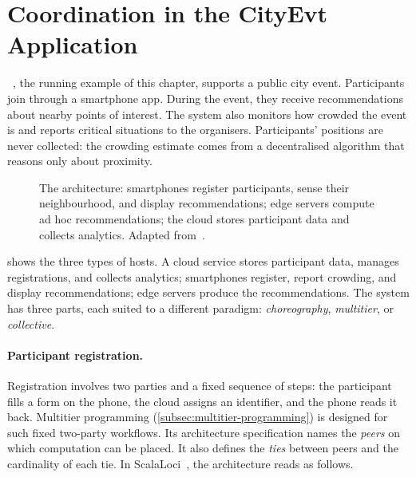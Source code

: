 \section{Coordination in the CityEvt Application}
\label{sec:multiparty-motivation}

\cityevt~\cite{Farabegoli:2026:CaMiL}, the running example of this chapter, supports a public city event.
%
Participants join through a smartphone app.
During the event, they receive recommendations about nearby points of interest.
%
The system also monitors how crowded the event is and reports critical situations to the organisers.
%
Participants' positions are never collected:
the crowding estimate comes from a decentralised algorithm that reasons only about proximity.

\begin{figure}[t]
    \centering
    \def\svgwidth{0.50\textwidth}
    
    \caption[The CityEvt architecture]{The \cityevt architecture: smartphones register participants, sense their neighbourhood, and display recommendations; edge servers compute ad hoc recommendations; the cloud stores participant data and collects analytics. Adapted from~\cite{Farabegoli:2026:CaMiL}.}
    \label{fig:cityevt-architecture}
\end{figure}

 shows the three types of hosts.
%
A cloud service stores participant data, manages registrations, and collects analytics;
smartphones register, report crowding, and display recommendations;
edge servers produce the recommendations.
%
The system has three parts,
each suited to a different paradigm: \emph{choreography}, \emph{multitier}, or \emph{collective}.

\paragraph{Participant registration.}
Registration involves two parties and a fixed sequence of steps:
the participant fills a form on the phone, the cloud assigns an identifier, and the phone reads it back.
%
Multitier programming (\cref{subsec:multitier-programming}) is designed for such fixed two-party workflows.
%
Its architecture specification names the \emph{peers} on which computation can be placed.
It also defines the \emph{ties} between peers and the cardinality of each tie.
%
In ScalaLoci~\cite{DBLP:journals/pacmpl/WeisenburgerKS18}, the \cityevt architecture reads as follows.

